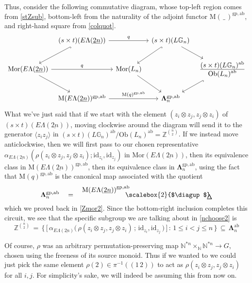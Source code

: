 \documentclass{amsbook} %
\newcommand{\id}{\textrm{id}}
\newcommand{\MLn}{\mathbf{\Lambda}_n}
\newcommand{\MorLn}{\mathrm{Mor}(L_n)}
\newcommand{\bigquotient}[2]{ \raisebox{0.75\height}{$#1$} \mkern-12mu\scalebox{2}{$\diagup$}\mkern-10mu \raisebox{-0.5\height}{$#2$} }
\newcommand{\ELnn}{E\Lambda(\underline{2n})}
\numberwithin{section}{chapter}
\begin{document}
Thus, consider the following commutative diagram, whose top-left region comes from \cref{stZsub}, bottom-left from the naturality of the adjoint functor $\mathrm{M}( \, \_ \, )^{\mathrm{gp},\mathrm{ab}}$, and right-hand square from \cref{colquot}.
\[ \begin{tikzcd}[column sep=tiny] 
& (s \times t)(\ELnn) \ar[dl, hookrightarrow] \ar[rr, "q"] & & (s \times t)(L\mathbb{G}_{n}) \ar[dl, hookrightarrow] \ar[dr] & \\
\mathrm{Mor}(\ELnn) \ar[rr, "q"] \ar[dr] & & \MorLn \ar[dr] & & \frac{\displaystyle (s \times t)(L\mathbb{G}_{n})^{\mathrm{ab}}}{\displaystyle \mathrm{Ob}(L_n)^{\mathrm{ab}}} \ar[dl, hookrightarrow] \\
& \mathrm{M}(\ELnn)^{\mathrm{gp},\mathrm{ab}} \ar[rr, "\mathrm{M}(q)^{\mathrm{gp},\mathrm{ab}}"] & & \MLn^{\mathrm{gp},\mathrm{ab}}
\end{tikzcd} \]
What we've just said that if we start with the element $(z_i \otimes z_j, z_j \otimes z_i)$ of $(s \times t)(\ELnn)$, moving clockwise around the diagram will send it to the generator $\langle z_i z_j \rangle$ in ${(s \times t)}(L\mathbb{G}_{n})^{\mathrm{ab}}/\mathrm{Ob}(L_n)^{\mathrm{ab}} = \mathbb{Z}^{{n}\choose{2}}$. If we instead move anticlockwise, then we will first pass to our chosen representative $\alpha_{\ELnn}(\rho(z_i \otimes z_j, z_j \otimes z_i); \id_{z_i}, \id_{z_j})$ in $\mathrm{Mor}(\ELnn)$, then its equivalence class in $\mathrm{M}(\ELnn)^{\mathrm{gp},\mathrm{ab}}$, then its equivalence class in $\MLn^{\mathrm{gp},\mathrm{ab}}$, using the fact that $\mathrm{M}(q)^{\mathrm{gp},\mathrm{ab}}$ is the canonical map associated with the quotient
\[ \MLn^{\mathrm{gp, ab}} \quad = \quad \bigquotient{{\mathrm{M}(\ELnn)}^{\mathrm{gp, ab}}}{\Delta} \]
which we proved back in \cref{Zmor2}. Since the bottom-right inclusion completes this circuit, we see that the specific subgroup we are talking about in \cref{nchoose2} is
\[ \mathbb{Z}^{{n}\choose{2}} \, = \, \big\{ \, \big[ \, \alpha_{\ELnn}\big( \, \rho(z_i \otimes z_j, z_j \otimes z_i) \, ; \,  \id_{z_i}, \id_{z_j} \, \big) \, \big] \, : \, 1 \le i < j \le n \, \big\} \, \subseteq \, \MLn^{\mathrm{ab}}\]

Of course, $\rho$ was an arbitrary permutation-preserving map $\mathbb{N}^{\ast n} \times_{\mathbb{N}} \mathbb{N}^{\ast n} \to G$, chosen using the freeness of its source monoid. Thus if we wanted to we could just pick the same element $\rho(2) \in \pi^{-1}((1 \, 2))$ to act as $\rho(z_i \otimes z_j, z_j \otimes z_i)$ for all $i, j$. For simplicity's sake, we will indeed be assuming this from now on.
\end{document}
